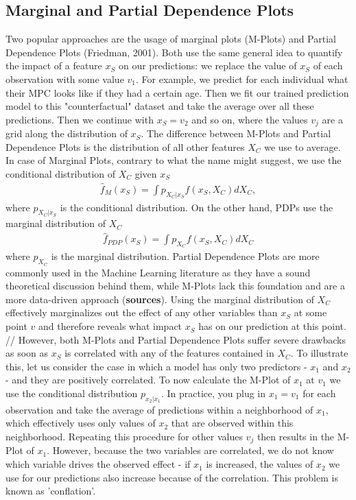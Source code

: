 \subsection{Marginal and Partial Dependence Plots}
Two popular approaches are the usage of marginal plots (M-Plots) and Partial Dependence Plots (Friedman, 2001). Both use the same general idea to quantify the impact of a feature $x_S$ on our predictions: we replace the value of $x_S$ of each observation with some value $v_1$. For example, we predict for each individual what their MPC looks like if they had a certain age. Then we fit our trained prediction model to this "counterfactual" dataset and take the average over all these predictions. Then we continue with $x_S=v_2$ and so on, where the values $v_j$ are a grid along the distribution of $x_S$. The difference between M-Plots and Partial Dependence Plots is the distribution of all other features $X_C$ we use to average. In case of Marginal Plots, contrary to what the name might suggest, we use the conditional distribution of $X_C$ given $x_S$ 
\begin{align}
\hat{f}_M(x_S)=\int p_{X_C|x_S} f(x_S, X_C)dX_C, 
\end{align}
where $p_{X_C|x_S}$ is the conditional distribution. On the other hand, PDPs use the marginal distribution of $X_C$
\begin{align}
    \hat{f}_{PDP}(x_S)=\int p_{X_C} f(x_S, X_C)dX_C \label{eq:pdp}
\end{align}
where $p_{X_C}$ is the marginal distribution. Partial Dependence Plots are more commonly used in the Machine Learning literature as they have a sound theoretical discussion behind them, while M-Plots lack this foundation and are a more data-driven approach (\textbf{sources}). Using the marginal distribution of $X_C$ effectively marginalizes out the effect of any other variables than $x_S$ at some point $v$ and therefore reveals what impact $x_S$ has on our prediction at this point. // 
However, both M-Plots and Partial Dependence Plots suffer severe drawbacks as soon as $x_S$ is correlated with any of the features contained in $X_C$. To illustrate this, let us consider the case in which a model has only two predictors - $x_1$ and $x_2$ - and they are positively correlated. To now calculate the M-Plot of $x_1$ at $v_1$ we use the conditional distribution $p_{x_2|x_1}$. In practice, you plug in $x_1=v_1$ for each observation and take the average of predictions within a neighborhood of $x_1$, which effectively uses only values of $x_2$  that are observed within this neighborhood. Repeating this procedure for other values $v_j$ then results in the M-Plot of $x_1$. However, because the two variables are correlated, we do not know which variable drives the observed effect - if $x_1$  is increased, the values of $x_2$  we use for our predictions also increase because of the correlation. This problem is known as 'conflation'. \\
